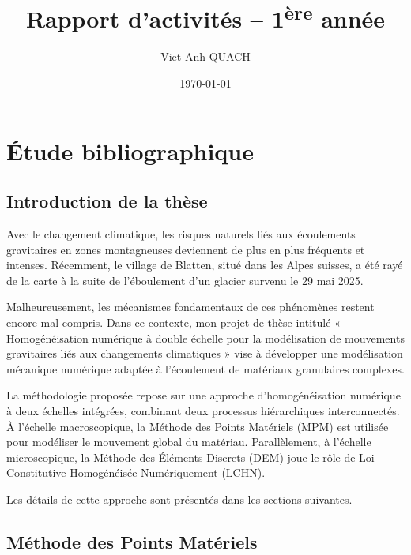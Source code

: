 \documentclass[a4paper,12pt]{report}
\title{Rapport d'activités -- 1\textsuperscript{ère} année}
\author{Viet Anh QUACH}
\date{\today}
\begin{document}
\maketitle
\tableofcontents

\setcounter{secnumdepth}{4}

\chapter{Étude bibliographique}
\section{Introduction de la thèse}
Avec le changement climatique, les risques naturels liés aux écoulements gravitaires en zones montagneuses deviennent de plus en plus fréquents et intenses.  
Récemment, le village de Blatten, situé dans les Alpes suisses, a été rayé de la carte à la suite de l’éboulement d’un glacier survenu le 29 mai 2025.  

Malheureusement, les mécanismes fondamentaux de ces phénomènes restent encore mal compris.  
Dans ce contexte, mon projet de thèse intitulé « Homogénéisation numérique à double échelle pour la modélisation de mouvements gravitaires liés aux changements climatiques » vise à développer une modélisation mécanique numérique adaptée à l’écoulement de matériaux granulaires complexes.

La méthodologie proposée repose sur une approche d’homogénéisation numérique à deux échelles intégrées, combinant deux processus hiérarchiques interconnectés.  
À l’échelle macroscopique, la Méthode des Points Matériels (MPM) est utilisée pour modéliser le mouvement global du matériau.  
Parallèlement, à l’échelle microscopique, la Méthode des Éléments Discrets (DEM) joue le rôle de Loi Constitutive Homogénéisée Numériquement (LCHN).  

Les détails de cette approche sont présentés dans les sections suivantes.

\section{Méthode des Points Matériels}
\end{document}

